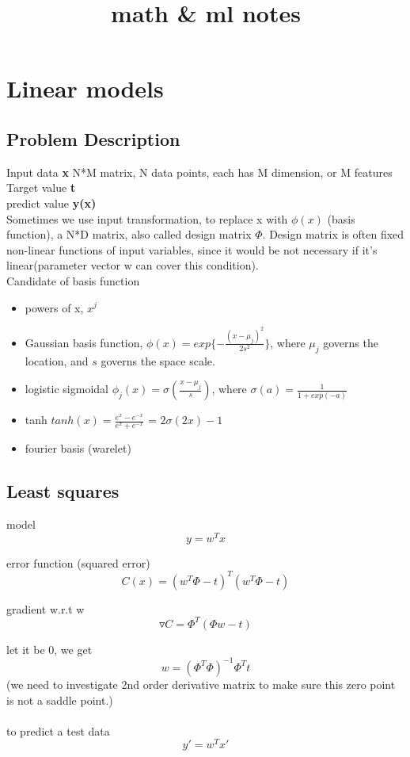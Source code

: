 \documentclass[10pt,a4paper]{book}
\title{math & ml notes}
\begin{document}
\chapter{Linear models}
\section{Problem Description}

Input data \textbf{x} N*M matrix, N data points, each has M dimension, or M features
\\
Target value \textbf{t}
\\
predict value \textbf{y(x)}
\\
Sometimes we use input transformation, to replace x with $\phi(x)$ (basis function), a N*D matrix, also called design matrix $\Phi$. Design matrix is often fixed non-linear functions of input variables, since it would be not necessary if it's linear(parameter vector w can cover this condition). 
\\

Candidate of basis function
\begin{itemize}
	\item powers of x, $x^j$
	\item Gaussian basis function, $\phi(x) = exp\{- \frac {(x-\mu_j)^2} {2s^2}\}$, where $\mu_j$ governs the location, and $s$ governs the space scale.
	\item logistic sigmoidal $\phi_j(x)=\sigma(\frac {x-\mu_j} s)$, where $\sigma(a) = \frac 1 {1+exp(-a)}$
	\item tanh $tanh(x) = \frac {e^x - e^{-x}} {e^x + e^{-x}}$ = $2\sigma(2x)-1$
	\item fourier basis (warelet)
\end{itemize}

\section{Least squares}
model
$$y = w^Tx$$

error function (squared error)
$$C(x) = (w^T\Phi - t)^T(w^T\Phi - t)$$

gradient w.r.t w
$$\triangledown C = \Phi^T(\Phi w -t)$$

let it be 0, we get 
$$w = (\Phi^T\Phi)^{-1}\Phi^Tt$$
(we need to investigate 2nd order derivative matrix to make sure this zero point is not a saddle point.)
\\
\\
to predict a test data
$$y' = w^Tx'$$
\end{document}
